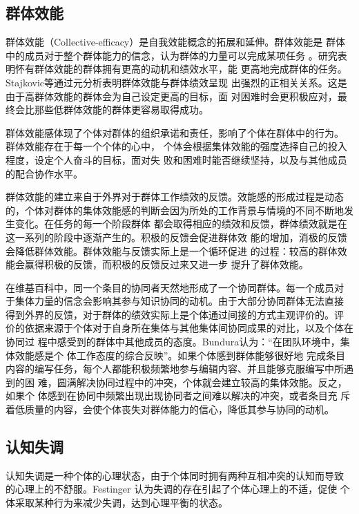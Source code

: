 \subsection{群体效能}
\label{sec:collective-efficacy}

群体效能（Collective-efficacy）是自我效能概念的拓展和延伸。群体效能是
群体中的成员对于整个群体能力的信念，认为群体的力量可以完成某项任务
\cite{bundura1977slt}。研究表明怀有群体效能的群体拥有更高的动机和绩效水平，能
更高地完成群体的任务。Stajkovic等通过元分析表明群体效能与群体绩效呈现
出强烈的正相关关系。这是由于高群体效能的群体会为自己设定更高的目标，面
对困难时会更积极应对，最终会比那些低群体效能的群体更容易取得成功\cite{stajkovic2009collective}。

群体效能感体现了个体对群体的组织承诺和责任，影响了个体在群体中的行为。
群体效能存在于每一个个体的心中，
个体会根据集体效能的强度选择自己的投入程度，设定个人奋斗的目标，面对失
败和困难时能否继续坚持，以及与其他成员的配合协作水平。

群体效能的建立来自于外界对于群体工作绩效的反馈。效能感的形成过程是动态
的，个体对群体的集体效能感的判断会因为所处的工作背景与情境的不同不断地发生变化。在任务的每一个阶段群体
都会取得相应的绩效和反馈，群体绩效就是在这一系列的阶段中逐渐产生的。积极的反馈会促进群体效
能的增加，消极的反馈会降低群体效能。群体效能与反馈实际上是一个循环促进
的过程：较高的群体效能会赢得积极的反馈，而积极的反馈反过来又进一步
提升了群体效能\cite{Gist}。

在维基百科中，同一个条目的协同者天然地形成了一个协同群体。每一个成员对
于集体力量的信念会影响其参与知识协同的动机。由于大部分协同群体无法直接
得到外界的反馈，对于群体的绩效实际上是个体通过间接的方式主观评价的。评
价的依据来源于个体对于自身所在集体与其他集体间协同成果的对比，以及个体在协同过
程中感受到的群体中其他成员的态度。Bundura认为：“在团队环境中，集体效能感是个
体工作态度的综合反映”\cite{bundura1977slt}。如果个体感到群体能够很好地
完成条目内容的编写任务，每个人都能积极频繁地参与编辑内容、并且能够克服编写中所遇到的困
难，圆满解决协同过程中的冲突，个体就会建立较高的集体效能。反之，如果个
体感到在协同中频繁出现出现协同者之间难以解决的冲突，或者条目充
斥着低质量的内容，会使个体丧失对群体能力的信心，降低其参与协同的动机。

\subsection{认知失调}
\label{sec:cognitive-dissonance}
认知失调是一种个体的心理状态，由于个体同时拥有两种互相冲突的认知而导致
的心理上的不舒服。Festinger 认为失调的存在引起了个体心理上的不适，促使
个体采取某种行为来减少失调，达到心理平衡的状态\cite{festinger1957theory}。

